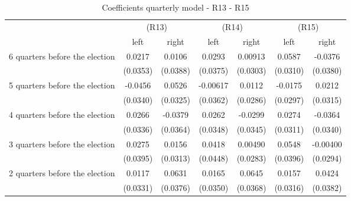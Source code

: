 \begin{table}[!ht]\centering \scriptsize
\def\sym#1{\ifmmode^{#1}\else\(^{#1}\)\fi}
\caption{Coefficients quarterly model - R13 - R15}
\begin{tabular}{l*{6}{c}}
\hline\hline
                    &\multicolumn{2}{c}{(R13)}&\multicolumn{2}{c}{(R14)}&\multicolumn{2}{c}{(R15)}\\
&\multicolumn{1}{c}{left}&\multicolumn{1}{c}{right}&\multicolumn{1}{c}{left}&\multicolumn{1}{c}{right}&\multicolumn{1}{c}{left}&\multicolumn{1}{c}{right}\\
\hline
 6 quarters before the election&      0.0217         &      0.0106         &      0.0293         &     0.00913         &      0.0587         &     -0.0376         \\
                    &    (0.0353)         &    (0.0388)         &    (0.0375)         &    (0.0303)         &    (0.0310)         &    (0.0380)         \\
[0,12em]
 5 quarters before the election&     -0.0456         &      0.0526         &    -0.00617         &      0.0112         &     -0.0175         &      0.0212         \\
                    &    (0.0340)         &    (0.0325)         &    (0.0362)         &    (0.0286)         &    (0.0297)         &    (0.0315)         \\
[0,12em]
 4 quarters before the election&      0.0266         &     -0.0379         &      0.0262         &     -0.0299         &      0.0274         &     -0.0364         \\
                    &    (0.0336)         &    (0.0364)         &    (0.0348)         &    (0.0345)         &    (0.0311)         &    (0.0340)         \\
[0,12em]
 3 quarters before the election&      0.0275         &      0.0156         &      0.0418         &     0.00490         &      0.0548         &    -0.00400         \\
                    &    (0.0395)         &    (0.0313)         &    (0.0448)         &    (0.0283)         &    (0.0396)         &    (0.0294)         \\
[0,12em]
 2 quarters before the election&      0.0117         &      0.0631         &      0.0165         &      0.0645         &      0.0157         &      0.0424         \\
                    &    (0.0331)         &    (0.0376)         &    (0.0350)         &    (0.0368)         &    (0.0316)         &    (0.0382)         \\

\end{tabular}
\end{table}
